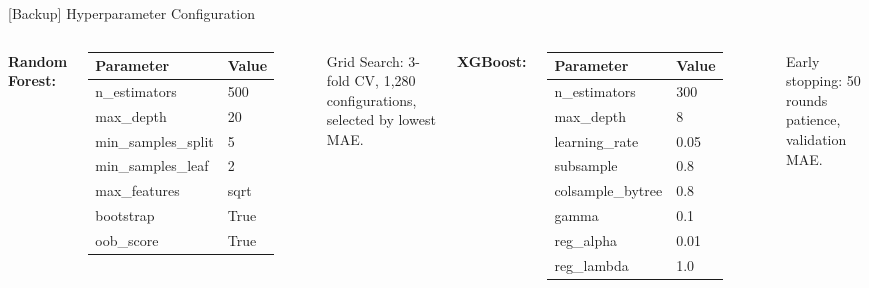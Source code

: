 \documentclass[aspectratio=169]{beamer}
\begin{document}
\begin{frame}{[Backup] Hyperparameter Configuration}
\begin{columns}[T]
\textbf{Random Forest:}
\begin{table}
\small
\begin{tabular}{ll}
\toprule
\textbf{Parameter} & \textbf{Value} \\
\midrule
n\_estimators       & 500 \\
max\_depth          & 20  \\
min\_samples\_split  & 5   \\
min\_samples\_leaf   & 2   \\
max\_features       & sqrt \\
bootstrap           & True \\
oob\_score          & True \\
\bottomrule
\end{tabular}
\end{table}
\vspace{0.1cm}
Grid Search: 3-fold CV, 1,280 configurations, selected by lowest MAE.

\textbf{XGBoost:}
\begin{table}
\small
\begin{tabular}{ll}
\toprule
\textbf{Parameter} & \textbf{Value} \\
\midrule
n\_estimators      & 300  \\
max\_depth         & 8    \\
learning\_rate     & 0.05 \\
subsample          & 0.8  \\
colsample\_bytree  & 0.8  \\
gamma              & 0.1  \\
reg\_alpha         & 0.01 \\
reg\_lambda        & 1.0  \\
\bottomrule
\end{tabular}
\end{table}
\vspace{0.1cm}
Early stopping: 50 rounds patience, validation MAE.
\end{columns}
\end{frame}
\end{document}
